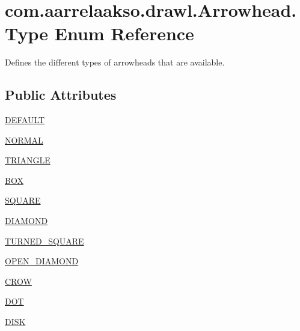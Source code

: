 \hypertarget{enumcom_1_1aarrelaakso_1_1drawl_1_1_arrowhead_1_1_type}{}\section{com.\+aarrelaakso.\+drawl.\+Arrowhead.\+Type Enum Reference}
\label{enumcom_1_1aarrelaakso_1_1drawl_1_1_arrowhead_1_1_type}


Defines the different types of arrowheads that are available.  


\subsection*{Public Attributes}
\begin{DoxyCompactItemize}
\item 
\hyperlink{enumcom_1_1aarrelaakso_1_1drawl_1_1_arrowhead_1_1_type_ae4c70d3cd0853637fba791f2bb29cd8e}{D\+E\+F\+A\+U\+LT}
\item 
\hyperlink{enumcom_1_1aarrelaakso_1_1drawl_1_1_arrowhead_1_1_type_abd0879a22002109b53e3d6af939c0734}{N\+O\+R\+M\+AL}
\item 
\hyperlink{enumcom_1_1aarrelaakso_1_1drawl_1_1_arrowhead_1_1_type_a84bfc9a808825452b04017d73f63f99e}{T\+R\+I\+A\+N\+G\+LE}
\item 
\hyperlink{enumcom_1_1aarrelaakso_1_1drawl_1_1_arrowhead_1_1_type_a823c7c75a5a70ecf72ee123eb4bec04f}{B\+OX}
\item 
\hyperlink{enumcom_1_1aarrelaakso_1_1drawl_1_1_arrowhead_1_1_type_a39ad0ea537ea80479c845425c4643abf}{S\+Q\+U\+A\+RE}
\item 
\hyperlink{enumcom_1_1aarrelaakso_1_1drawl_1_1_arrowhead_1_1_type_a038817b0bde4231adfc55dd4f507df5c}{D\+I\+A\+M\+O\+ND}
\item 
\hyperlink{enumcom_1_1aarrelaakso_1_1drawl_1_1_arrowhead_1_1_type_a463ab7af648a68ee790781ab09c04b49}{T\+U\+R\+N\+E\+D\+\_\+\+S\+Q\+U\+A\+RE}
\item 
\hyperlink{enumcom_1_1aarrelaakso_1_1drawl_1_1_arrowhead_1_1_type_a7bedad9291c6683881dbcdfdc4370035}{O\+P\+E\+N\+\_\+\+D\+I\+A\+M\+O\+ND}
\item 
\hyperlink{enumcom_1_1aarrelaakso_1_1drawl_1_1_arrowhead_1_1_type_af2ade96c668c81e82484da17f28ccf13}{C\+R\+OW}
\item 
\hyperlink{enumcom_1_1aarrelaakso_1_1drawl_1_1_arrowhead_1_1_type_ad1e2ede480af8de60271d06f2eeff6ca}{D\+OT}
\item 
\hyperlink{enumcom_1_1aarrelaakso_1_1drawl_1_1_arrowhead_1_1_type_a474091c67ecdac839f2402301a46dc5d}{D\+I\+SK}

\end{DoxyCompactItemize}
